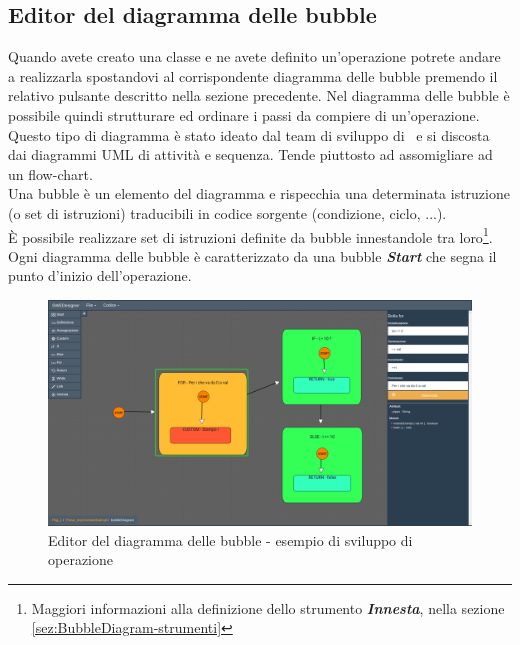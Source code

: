 \documentclass[../ManualeUtente.tex]{subfiles}
\begin{document}
		\subsection{Editor del diagramma delle bubble}\label{sez:BubbleDiagram}
			Quando avete creato una classe e ne avete definito un'operazione potrete andare a realizzarla spostandovi al
			corrispondente diagramma delle bubble premendo il relativo pulsante descritto nella sezione precedente.
			Nel diagramma delle bubble è possibile quindi strutturare ed ordinare i passi da compiere di un'operazione.
			Questo tipo di diagramma è stato ideato dal team di sviluppo di \progetto\
			e si discosta dai diagrammi UML di attività e sequenza. Tende piuttosto ad assomigliare ad un
			flow-chart.\\
			Una bubble è un elemento del diagramma e rispecchia una determinata istruzione (o set di
			istruzioni) traducibili in codice sorgente (condizione, ciclo, ...).\\
			È possibile realizzare set di istruzioni definite da bubble innestandole tra loro\footnote{Maggiori informazioni alla definizione dello strumento \textit{\textbf{Innesta}}, nella sezione \ref{sez:BubbleDiagram-strumenti}}.
			Ogni diagramma delle bubble è caratterizzato da una bubble \textit{\textbf{Start}} che segna
			il punto d'inizio dell'operazione.
			\begin{figure} [h!]
				\centering
				\includegraphics[scale=0.24]{./Immagini/BubbleDiagram.png}
				\caption{Editor del diagramma delle bubble - esempio di sviluppo di operazione}\label{fig:BubbleDiagram}
			\end{figure}
\end{document}
